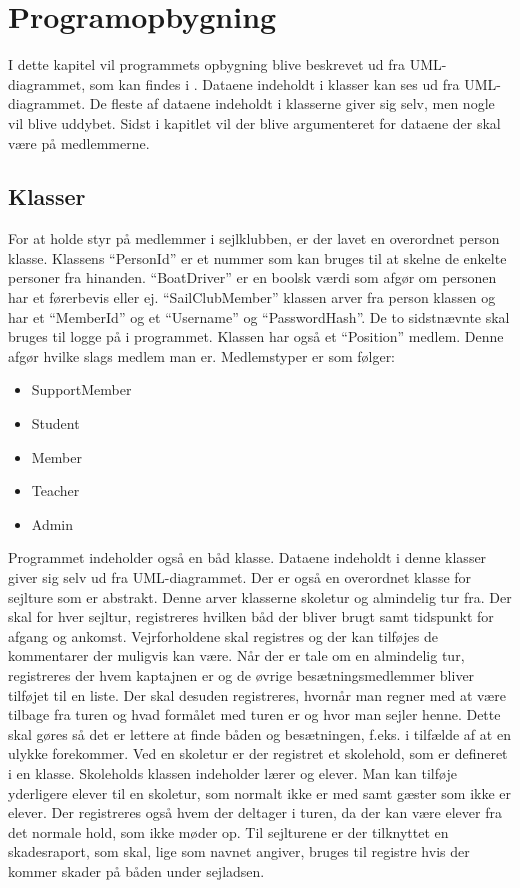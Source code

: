 \chapter{Programopbygning}

I dette kapitel vil programmets opbygning blive beskrevet ud fra UML-diagrammet, som kan findes i .
Dataene indeholdt i klasser kan ses ud fra UML-diagrammet. De fleste af dataene indeholdt i klasserne giver sig selv,
men nogle vil blive uddybet.
Sidst i kapitlet vil der blive argumenteret for dataene der skal være på medlemmerne.


\section{Klasser}

For at holde styr på medlemmer i sejlklubben, er der lavet en overordnet person klasse. Klassens ``PersonId'' er et
nummer som kan bruges til at skelne de enkelte personer fra hinanden. ``BoatDriver'' er en boolsk værdi som afgør om
personen har et førerbevis eller ej. ``SailClubMember'' klassen arver fra person klassen og har et ``MemberId'' og et
``Username'' og ``PasswordHash''. De to sidstnævnte skal bruges til logge på i programmet. Klassen har også et
``Position'' medlem. Denne afgør hvilke slags medlem man er. Medlemstyper er som følger:

\begin{itemize}
\item SupportMember
\item Student
\item Member
\item Teacher
\item Admin
\end{itemize}

Programmet indeholder også en båd klasse. Dataene indeholdt i denne klasser giver sig selv ud fra UML-diagrammet. Der er
også en overordnet klasse for sejlture som er abstrakt. Denne arver klasserne skoletur og almindelig tur fra. Der skal
for hver sejltur, registreres hvilken båd der bliver brugt samt tidspunkt for afgang og ankomst. Vejrforholdene skal
registres og der kan tilføjes de kommentarer der muligvis kan være. Når der er tale om en almindelig tur, registreres
der hvem kaptajnen er og de øvrige besætningsmedlemmer bliver tilføjet til en liste. Der skal desuden registreres,
hvornår man regner med at være tilbage fra turen og hvad formålet med turen er og hvor man sejler henne. Dette skal
gøres så det er lettere at finde båden og besætningen, f.eks. i tilfælde af at en ulykke forekommer.
Ved en skoletur er der registret et skolehold, som er defineret i en klasse. Skoleholds klassen indeholder lærer og
elever. Man kan tilføje yderligere elever til en skoletur, som normalt ikke er med samt gæster som ikke er elever. Der
registreres også hvem der deltager i turen, da der kan være elever fra det normale hold, som ikke møder op. Til
sejlturene er der tilknyttet en skadesraport, som skal, lige som navnet angiver, bruges til registre hvis der kommer
skader på båden under sejladsen. 


